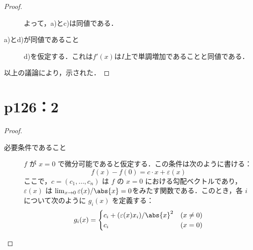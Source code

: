 \documentclass[a4paper,10pt,fleqn]{ltjsarticle}
\begin{document}
\begin{tleftbar}
\begin{proof}
\begin{description}
            よって，a)とc)は同値である．

            \item[a)とd)が同値であること] \mbox{} \par
            d)を仮定する．これは$f'(x)$は$I$上で単調増加であることと同値である． 
        \end{description}
        以上の議論により，示された．
    \end{proof}
\end{tleftbar}


\section*{p126：2}


\begin{tleftbar}
    \begin{proof}
        \begin{description}
            \item[必要条件であること] 
            $ f $ が $ x=0 $ で微分可能であると仮定する．この条件は次のように書ける：
            \[
            f(x) - f(0) = c \cdot x + \varepsilon(x)
            \]
            ここで，$ c = (c_1, \ldots, c_n) $ は $ f $ の $ x=0 $ における勾配ベクトルであり，$ \varepsilon(x) $ は
            $\lim_{x \to 0} \varepsilon(x)/\abs{x} = 0$をみたす関数である．このとき，各 $ i $ について次のように $ g_i(x) $ を定義する：
            \[
            g_i(x) = 
            \begin{cases}
            c_i + (\varepsilon(x) x_i)/\abs{x}^2 & (x \ne 0) \\
            c_i & (x = 0)
            \end{cases}
            \]


\end{description}
\end{proof}
\end{tleftbar}
\end{document}
